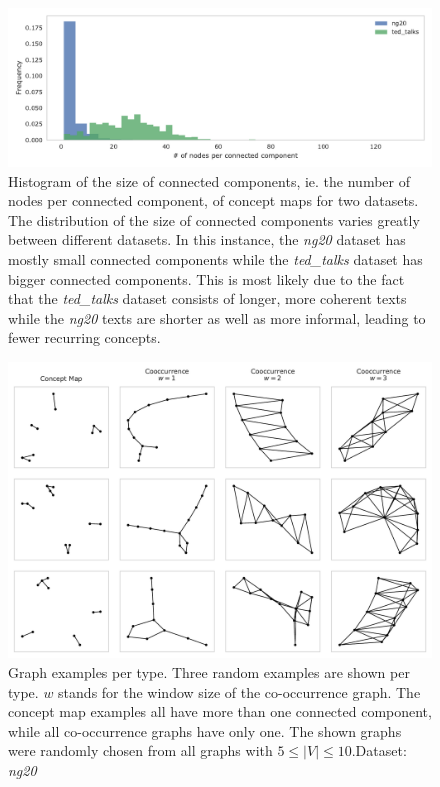 \begin{figure}[htb!]
	\centering
	\includegraphics[width=0.9\linewidth]{assets/figures/connected_component_size_comparison.pdf}
	\caption[Statistics: Histogram of size of connectec components]{Histogram of the size of connected components, ie. the number of nodes per connected component, of concept maps for two datasets. The distribution of the size of connected components varies greatly between different datasets. In this instance, the \textit{ng20} dataset has mostly small connected components while the \textit{ted\_talks} dataset has bigger connected components. This is most likely due to the fact that the \textit{ted\_talks} dataset consists of longer, more coherent texts while the \textit{ng20} texts are shorter as well as more informal, leading to fewer recurring concepts.}
	\label{fig:histogram_connected_component_size}
\end{figure}

\begin{figure}[htb!]
\centering
\includegraphics[width=0.8\linewidth]{assets/figures/examples_graphs.pdf}
\caption[Examples: Graph types]{Graph examples per type. Three random examples are shown per type. $w$ stands for the window size of the co-occurrence graph. The concept map examples all have more than one connected component, while all co-occurrence graphs have only one. The shown graphs were randomly chosen from all graphs with $5 \leq |V| \leq 10$.Dataset: \textit{ng20}}\label{fig:graph_examples}
\end{figure}

